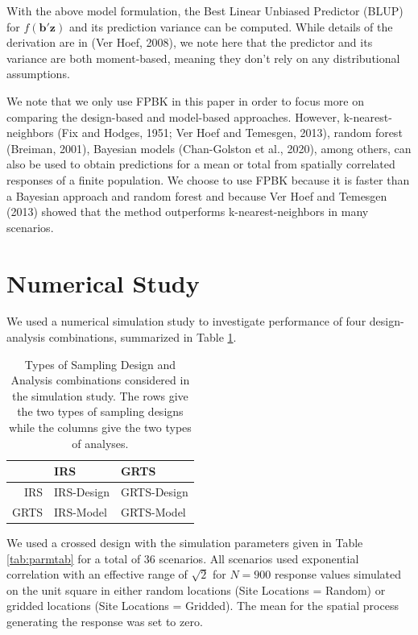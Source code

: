 \documentclass[]{elsarticle} %
\begin{document}
With the above model formulation, the Best Linear Unbiased Predictor
(BLUP) for \(f(\mathbf{b}'\mathbf{z})\) and its prediction variance can
be computed. While details of the derivation are in (Ver Hoef, 2008), we
note here that the predictor and its variance are both moment-based,
meaning they don't rely on any distributional assumptions.

We note that we only use FPBK in this paper in order to focus more on
comparing the design-based and model-based approaches. However,
k-nearest-neighbors (Fix and Hodges, 1951; Ver Hoef and Temesgen, 2013),
random forest (Breiman, 2001), Bayesian models (Chan-Golston et al.,
2020), among others, can also be used to obtain predictions for a mean
or total from spatially correlated responses of a finite population. We
choose to use FPBK because it is faster than a Bayesian approach and
random forest and because Ver Hoef and Temesgen (2013) showed that the
method outperforms k-nearest-neighbors in many scenarios.

\hypertarget{sec:numstudy}{%
\section{Numerical Study}\label{sec:numstudy}}

We used a numerical simulation study to investigate performance of four
design-analysis combinations, summarized in Table
\ref{tab:designanalysis}.

\begin{table}[ht]
\centering
\begin{tabular}{r|ll}
  \hline
 & IRS & GRTS \\ 
  \hline
IRS & IRS-Design & GRTS-Design \\ 
  GRTS & IRS-Model & GRTS-Model \\ 
   \hline
\end{tabular}
\caption{\label{tab:designanalysis} Types of Sampling Design and Analysis combinations considered in the simulation study. The rows give the two types of sampling designs while the columns give the two types of analyses.} 
\end{table}

We used a crossed design with the simulation parameters given in Table
\ref{tab:parmtab} for a total of 36 scenarios. All scenarios used
exponential correlation with an effective range of \(\sqrt{2}\) for
\(N = 900\) response values simulated on the unit square in either
random locations (Site Locations = Random) or gridded locations (Site
Locations = Gridded). The mean for the spatial process generating the
response was set to zero.
\end{document}
